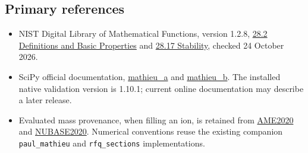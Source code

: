 \documentclass[
  aps,
  onecolumn,
  11pt]{revtex4-2}
\providecommand{\tightlist}{%
  \setlength{\itemsep}{0pt}\setlength{\parskip}{0pt}}
\begin{document}
\subsection{Primary references}\label{primary-references}

\begin{itemize}
\tightlist
\item
  NIST Digital Library of Mathematical Functions, version 1.2.8,
  \href{https://dlmf.nist.gov/28.2}{28.2 Definitions and Basic
  Properties} and \href{https://dlmf.nist.gov/28.17}{28.17 Stability},
  checked 24 October 2026.
\item
  SciPy official documentation,
  \href{https://docs.scipy.org/doc/scipy/reference/generated/scipy.special.mathieu_a.html}{mathieu\_a}
  and
  \href{https://docs.scipy.org/doc/scipy/reference/generated/scipy.special.mathieu_b.html}{mathieu\_b}.
  The installed native validation version is 1.10.1; current online
  documentation may describe a later release.
\item
  Evaluated mass provenance, when filling an ion, is retained from
  \href{https://www-nds.iaea.org/amdc/ame2020/mass_1.mas20.txt}{AME2020}
  and
  \href{https://www-nds.iaea.org/amdc/ame2020/nubase_4.mas20.txt}{NUBASE2020}.
  Numerical conventions reuse the existing companion
  \texttt{paul\_mathieu} and \texttt{rfq\_sections} implementations.
\end{itemize}
\end{document}
